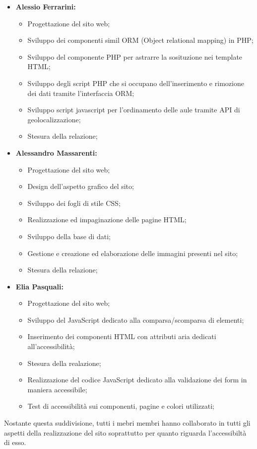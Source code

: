 \begin{itemize}
    \item \textbf{Alessio Ferrarini:}
        \begin{itemize}
            \item Progettazione del sito web;
            \item Sviluppo dei componenti simil ORM (Object relational mapping) in PHP;
            \item Sviluppo del componente PHP per astrarre la sosituzione nei template HTML;
            \item Sviluppo degli script PHP che si occupano dell'inserimento e rimozione dei dati tramite l'interfaccia ORM;
            \item Sviluppo script javascript per l'ordinamento delle aule tramite API di geolocalizzazione;
            \item Stesura della relazione;
        \end{itemize}
    \item \textbf{Alessandro Massarenti:}
        \begin{itemize}
            \item Progettazione del sito web;
            \item Design dell'aspetto grafico del sito;
            \item Sviluppo dei fogli di stile CSS;
            \item Realizzazione ed impaginazione delle pagine HTML;
            \item Sviluppo della base di dati;
            \item Gestione e creazione ed elaborazione delle immagini presenti nel sito;
            \item Stesura della relazione;
        \end{itemize}
    \item \textbf{Elia Pasquali:}
        \begin{itemize}
            \item Progettazione del sito web;
            \item Sviluppo del JavaScript dedicato alla comparsa/scomparsa di elementi;
            \item Inserimento dei componenti HTML con attributi aria dedicati all'accessibilità;
            \item Stesura della realazione;
            \item Realizzazione del codice JavaScript dedicato alla validazione dei form in maniera accessibile;
            \item Test di accessibilità sui componenti, pagine e colori utilizzati;
        \end{itemize}
\end{itemize}

Nostante questa suddivisione, tutti i mebri membri hanno collaborato in tutti gli aspetti della realizzazione del sito soprattutto per quanto riguarda l'accessibiltà di esso.
